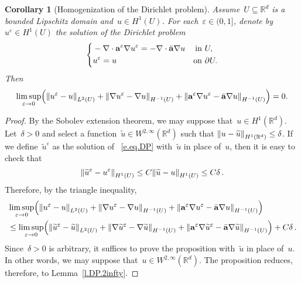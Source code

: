 \documentclass[11pt,twoside]{article} %
\numberwithin{equation}{section}
\newtheorem{corollary}[theorem]{Corollary}
\theoremstyle{definition}
\let\originalleft\left
\let\originalright\right
\renewcommand{\left}{\mathopen{}\mathclose\bgroup\originalleft}
\renewcommand{\right}{\aftergroup\egroup\originalright}
\newcommand*{\Rd}{\ensuremath{\mathbb{R}^d}}
\newcommand{\eps}{\varepsilon}
\renewcommand*{\tilde}{\widetilde}
\newcommand{\ep}{\eps}
\renewcommand{\a}{\mathbf{a}}
\newcommand{\ahom}{\bar{\a}}
\begin{document}
\begin{corollary}[Homogenization of the Dirichlet problem]
\label{c.DP}
Assume~$U\subseteq\Rd$ is a bounded Lipschitz domain and~$u\in H^1(U)$. For each~$\ep\in (0,1]$, denote by~$u^\ep \in H^1(U)$ the solution of the Dirichlet problem 
\begin{align}
\label{e.eq.DP}
\left\{
\begin{aligned}
& -\nabla \cdot \a^\ep \nabla u^\ep = - \nabla \cdot \ahom\nabla u & \mbox{in} & \ U, 
\\
& u^\ep = u & \mbox{on} & \ \partial U. 
\end{aligned}
\right.
\end{align}
Then
\begin{equation}
\label{e.Dp.homog}
\limsup_{\ep\to 0} 
\Bigl( 
\left\| u^\ep - u \right\|_{L^2(U)}
+ 
\left\| \nabla u^\ep - \nabla u \right\|_{H^{-1}(U)} 
+
\left\| \a^\ep \nabla u^\ep - \ahom \nabla u \right\|_{H^{-1}(U)} 
\Bigr)
= 0.
\end{equation}
\end{corollary}
\begin{proof}
By the Sobolev extension theorem, we may suppose that~$u\in H^1(\Rd)$. Let~$\delta>0$ and select a function~$\tilde{u} \in W^{2,\infty}(\Rd)$ such that 
$\left\| u - \tilde{u} \right\|_{H^1(\Rd)} \leq \delta$. If we define~$\tilde{u}^\ep$ as the solution of ~\eqref{e.eq.DP} with~$\tilde{u}$ in place of~$u$, then it is easy to check that
\begin{equation}
\left\| \tilde{u}^\ep - u^\ep \right\|_{H^1(U)} 
\leq 
C\left\| \tilde{u} - u \right\|_{H^1(U)} 
\leq C\delta\,. 
\end{equation}
Therefore, by the triangle inequality, 
\begin{align*}
& \limsup_{\ep\to 0} 
\Bigl( 
\left\| u^\ep - u \right\|_{L^2(U)}
+ 
\left\| \nabla u^\ep - \nabla u \right\|_{H^{-1}(U)} 
+
\left\| \a^\ep \nabla u^\ep - \ahom \nabla u \right\|_{H^{-1}(U)} 
\Bigr)
\\ & 
\leq
\limsup_{\ep\to 0} 
\Bigl( 
\left\|  \tilde{u}^\ep -  \tilde{u} \right\|_{L^2(U)}
+ 
\left\| \nabla  \tilde{u}^\ep - \nabla  \tilde{u} \right\|_{H^{-1}(U)} 
+
\left\| \a^\ep \nabla  \tilde{u}^\ep - \ahom \nabla  \tilde{u} \right\|_{H^{-1}(U)} 
\Bigr)
+ C\delta\,. 
\end{align*}
Since~$\delta>0$ is arbitrary, it suffices to prove the proposition with~$\tilde{u}$ in place of~$u$. In other words, we may suppose that~$u \in W^{2,\infty}(\Rd)$. The proposition reduces, therefore, to Lemma~\ref{l.DP.2infty}. 
\end{proof}
\end{document}
